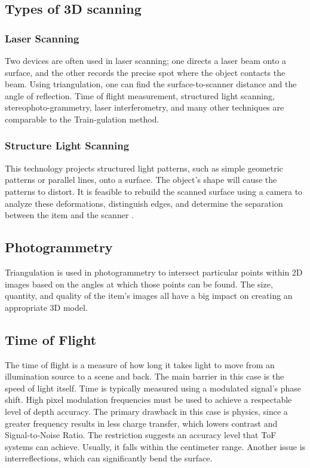 \documentclass[12pt]{article}
\begin{document}
\subsection{Types of 3D scanning}

\subsubsection {Laser Scanning}
Two devices are often used in laser scanning; one directs a laser beam onto a surface, and the other records the precise spot where the object contacts the beam. Using triangulation, one can find the surface-to-scanner distance and the angle of reflection.  Time of flight measurement, structured light scanning, stereophoto-grammetry, laser interferometry, and many other techniques are comparable to the Train-gulation method\cite{ref17}.

\subsubsection {Structure Light Scanning}
This technology projects structured light patterns, such as simple geometric patterns or parallel lines, onto a surface.  The object's shape will cause the patterns to distort.  It is feasible to rebuild the scanned surface using a camera to analyze these deformations, distinguish edges, and determine the separation between the item and the scanner \cite{ref17}.

\subsection {Photogrammetry}
Triangulation is used in photogrammetry to intersect particular points within 2D images based on the angles at which those points can be found. The size, quantity, and quality of the item's images all have a big impact on creating an appropriate 3D model\cite{ref17}. 

\subsection{Time of Flight}
The time of flight is a measure of how long it takes light to move from an illumination source to a scene and back. The main barrier in this case is the speed of light itself.  Time is typically measured using a modulated signal's phase shift. High pixel modulation frequencies must be used to achieve a respectable level of depth accuracy. The primary drawback in this case is physics, since a greater frequency results in less charge transfer, which lowers contrast and Signal‑to‑Noise Ratio. The restriction suggests an accuracy level that ToF systems can achieve. Usually, it falls within the centimeter range. Another issue is interreflections, which can significantly bend the surface\cite{ref15}.
\end{document}
